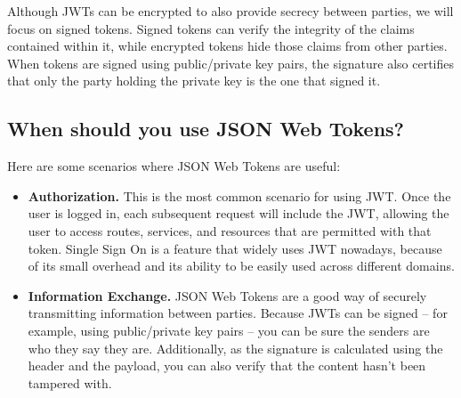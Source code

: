 Although JWTs can be encrypted to also provide secrecy between parties, we will focus on signed tokens.
Signed tokens can verify the integrity of the claims contained within it, while encrypted tokens hide those claims from
other parties.
When tokens are signed using public/private key pairs, the signature also certifies that only the party holding the
private key is the one that signed it.

\subsection{When should you use JSON Web Tokens?}\label{subsec:when-should-you-use-json-web-tokens?}

Here are some scenarios where JSON Web Tokens are useful:

\begin{itemize}
    \item \textbf{Authorization.} This is the most common scenario for using JWT. Once the user is logged in, each
    subsequent request will include the JWT, allowing the user to access routes, services, and resources that are permitted
    with that token.
    Single Sign On is a feature that widely uses JWT nowadays, because of its small overhead and its ability to be easily
    used across different domains.
    \item \textbf{Information Exchange.} JSON Web Tokens are a good way of securely transmitting information between
    parties.
    Because JWTs can be signed -- for example, using public/private key pairs -- you can be sure the senders are who they
    say they are.
    Additionally, as the signature is calculated using the header and the payload, you can also verify that the content
    hasn't been tampered with.
\end{itemize}


